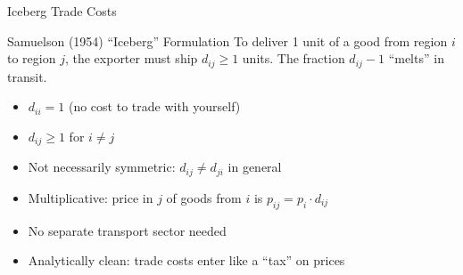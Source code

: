 \documentclass{beamer}
\begin{document}
\begin{frame}{Iceberg Trade Costs}

    \begin{exampleblock}{Samuelson (1954) ``Iceberg'' Formulation}
        To deliver 1 unit of a good from region $i$ to region $j$, the exporter must ship $d_{ij} \geq 1$ units. The fraction $d_{ij} - 1$ ``melts'' in transit.
    \end{exampleblock}

    \vspace{0.5em}
    \begin{itemize}
        \item $d_{ii} = 1$ (no cost to trade with yourself)
        \item $d_{ij} \geq 1$ for $i \neq j$
        \item Not necessarily symmetric: $d_{ij} \neq d_{ji}$ in general
    \end{itemize}

    \vspace{0.5em}
    \begin{itemize}
        \item Multiplicative: price in $j$ of goods from $i$ is $p_{ij} = p_i \cdot d_{ij}$
        \item No separate transport sector needed
        \item Analytically clean: trade costs enter like a ``tax'' on prices
    \end{itemize}

\end{frame}
\end{document}
